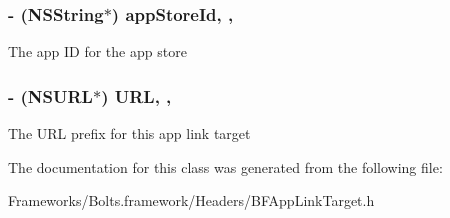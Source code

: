 \subsubsection[{app\+Store\+Id}]{\setlength{\rightskip}{0pt plus 5cm}-\/ (N\+S\+String$\ast$) app\+Store\+Id\hspace{0.3cm}{\ttfamily [read]}, {\ttfamily [nonatomic]}, {\ttfamily [copy]}}\label{interface_b_f_app_link_target_ac7750ffc69198f8bf2ddbed9046eca60}
The app I\+D for the app store \hypertarget{interface_b_f_app_link_target_a709dbbdd1a196272352283877f45783e}{}
\subsubsection[{U\+R\+L}]{\setlength{\rightskip}{0pt plus 5cm}-\/ (N\+S\+U\+R\+L$\ast$) U\+R\+L\hspace{0.3cm}{\ttfamily [read]}, {\ttfamily [nonatomic]}, {\ttfamily [strong]}}\label{interface_b_f_app_link_target_a709dbbdd1a196272352283877f45783e}
The U\+R\+L prefix for this app link target 

The documentation for this class was generated from the following file\+:\begin{DoxyCompactItemize}
\item 
Frameworks/\+Bolts.\+framework/\+Headers/B\+F\+App\+Link\+Target.\+h\end{DoxyCompactItemize}
